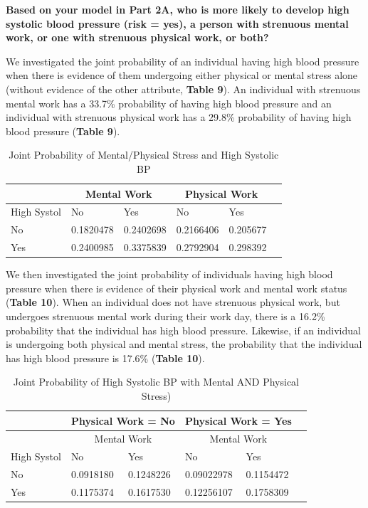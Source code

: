 \documentclass[]{article}
\begin{document}
\textbf{Based on your model in Part 2A, who is more likely to develop high systolic blood pressure (risk = yes), a person with strenuous mental work, or one with strenuous physical work, or both?}

We investigated the joint probability of an individual having high blood
pressure when there is evidence of them undergoing either physical or
mental stress alone (without evidence of the other attribute,
\textbf{Table 9}). An individual with strenuous mental work has a 33.7\%
probability of having high blood pressure and an individual with
strenuous physical work has a 29.8\% probability of having high blood
pressure (\textbf{Table 9}).

\begin{table}[]
\centering
\begin{tabular}{|l|l|l|l|l|l|}
\hline
        & \multicolumn{2}{|c|}{Mental Work} & \multicolumn{2}{|c|}{Physical Work} \\ \hline    
High Systol  & No        & Yes                & No          & Yes \\ \hline
No      & 0.1820478 & 0.2402698               & 0.2166406   & 0.205677 \\ \hline
Yes     & 0.2400985 & 0.3375839               & 0.2792904   & 0.298392 \\ \hline
\end{tabular}
\caption{Joint Probability of Mental/Physical Stress and High Systolic BP}
\label{my-label}
\end{table}

We then investigated the joint probability of individuals having high
blood pressure when there is evidence of their physical work and mental
work status (\textbf{Table 10}). When an individual does not have
strenuous physical work, but undergoes strenuous mental work during
their work day, there is a 16.2\% probability that the individual has
high blood pressure. Likewise, if an individual is undergoing both
physical and mental stress, the probability that the individual has high
blood pressure is 17.6\% (\textbf{Table 10}).

\begin{table}[]
\centering
\begin{tabular}{|l|l|l|l|l|l|}
\hline
        & \multicolumn{2}{|c|}{Physical Work = No} & \multicolumn{2}{|c|}{Physical Work = Yes} \\ \hline  
        & \multicolumn{2}{|c|}{Mental Work} & \multicolumn{2}{|c|}{Mental Work} \\ \hline    
High Systol  & No        & Yes                & No           & Yes \\ \hline
No      & 0.0918180 & 0.1248226               & 0.09022978   & 0.1154472 \\ \hline
Yes     & 0.1175374 & 0.1617530               & 0.12256107   & 0.1758309 \\ \hline
\end{tabular}
\caption{Joint Probability of High Systolic BP with Mental AND Physical Stress)}
\label{my-label}
\end{table}
\end{document}
